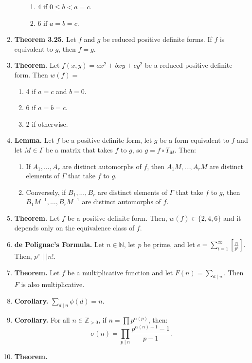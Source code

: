 \documentclass[11pt]{article}
\theoremstyle{definition}
\theoremstyle{named}
\begin{document}
\begin{enumerate}
\begin{enumerate}
\begin{enumerate}
            \item 4 if $0 \leq b < a = c$.
            \item 6 if $a=b=c$.
        \end{enumerate}
    \end{enumerate}
    \item \textbf{Theorem 3.25. } Let $f$ and $g$ be reduced positive definite forms. If $f$ is equivalent to $g$, then $f=g$. 
    \item \textbf{Theorem. } Let $f(x,y) = ax^2 + bxy + cy^2$ be a reduced positive definite form. Then $w(f) = $
    \begin{enumerate}
        \item 4 if $a=c$ and $b=0$.
        \item 6 if $a=b=c$.
        \item 2 if otherwise. 
    \end{enumerate}
    \item \textbf{Lemma. } Let $f$ be a positive definite form, let $g$ be a form equivalent to $f$ and let $M \in \Gamma$ be a matrix that takes $f$ to $g$, so $g = f \circ T_M$. Then: 
    \begin{enumerate}
        \item If $A_1,\dots,A_r$ are distinct automorphs of $f$, then $A_1M, \dots, A_rM$ are distinct elements of $\Gamma$ that take $f$ to $g$. 
        \item Conversely, if $B_1,\dots,B_r$ are distinct elements of $\Gamma$ that take $f$ to $g$, then $B_1M^{-1}, \dots, B_rM^{-1}$ are distinct automorphs of $f$. 
    \end{enumerate}
    \item \textbf{Theorem. } Let $f$ be a positive definite form. Then, $w(f) \in \{2,4,6\}$ and it depends only on the equivalence class of $f$. 
    \item \textbf{de Polignac's Formula. } Let $n \in \mathbb{N}$, let $p$ be prime, and let $e = \sum_{i=1}^{\infty} \left[\frac{n}{p^i}\right]$. Then, $p^e \mid\mid n!$. 
    \item \textbf{Theorem. } Let $f$ be a multiplicative function and let $F(n) = \sum_{d \mid n}$. Then $F$ is also multiplicative. 
    \item \textbf{Corollary. } $\sum_{d \mid n} \phi(d) = n$. 
    \item \textbf{Corollary. } For all $n \in \mathbb{Z}_{>0}$, if $n = \prod p^{\alpha(p)}$, then: 
    $$
    \sigma(n) = \prod_{p \mid n} \frac{p^{\alpha(n)+1} - 1}{p - 1}. 
    $$
    \item \textbf{Theorem. } 

\end{enumerate}
\end{document}
